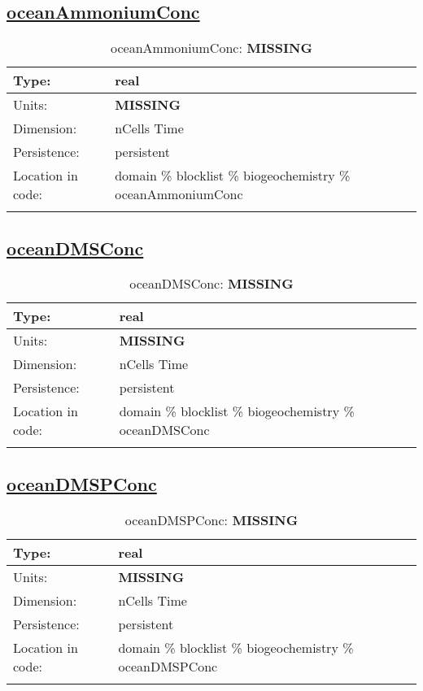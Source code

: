 \subsection[oceanAmmoniumConc]{\hyperref[sec:var_tab_biogeochemistry]{oceanAmmoniumConc}}
\label{subsec:var_sec_biogeochemistry_oceanAmmoniumConc}
\begin{center}
\begin{longtable}{| p{2.0in} | p{4.0in} |}
        \hline 
        Type: & real \\
        \hline 
        Units: & {\bf \color{red} MISSING} \\
        \hline 
        Dimension: & nCells Time \\
        \hline 
        Persistence: & persistent \\
        \hline 
         Location in code: & domain \% blocklist \% biogeochemistry \% oceanAmmoniumConc \\
         \hline 
    \caption{oceanAmmoniumConc: {\bf \color{red} MISSING}}
\end{longtable}
\end{center}
\subsection[oceanDMSConc]{\hyperref[sec:var_tab_biogeochemistry]{oceanDMSConc}}
\label{subsec:var_sec_biogeochemistry_oceanDMSConc}
\begin{center}
\begin{longtable}{| p{2.0in} | p{4.0in} |}
        \hline 
        Type: & real \\
        \hline 
        Units: & {\bf \color{red} MISSING} \\
        \hline 
        Dimension: & nCells Time \\
        \hline 
        Persistence: & persistent \\
        \hline 
         Location in code: & domain \% blocklist \% biogeochemistry \% oceanDMSConc \\
         \hline 
    \caption{oceanDMSConc: {\bf \color{red} MISSING}}
\end{longtable}
\end{center}
\subsection[oceanDMSPConc]{\hyperref[sec:var_tab_biogeochemistry]{oceanDMSPConc}}
\label{subsec:var_sec_biogeochemistry_oceanDMSPConc}
\begin{center}
\begin{longtable}{| p{2.0in} | p{4.0in} |}
        \hline 
        Type: & real \\
        \hline 
        Units: & {\bf \color{red} MISSING} \\
        \hline 
        Dimension: & nCells Time \\
        \hline 
        Persistence: & persistent \\
        \hline 
         Location in code: & domain \% blocklist \% biogeochemistry \% oceanDMSPConc \\
         \hline 
    \caption{oceanDMSPConc: {\bf \color{red} MISSING}}
\end{longtable}
\end{center}
